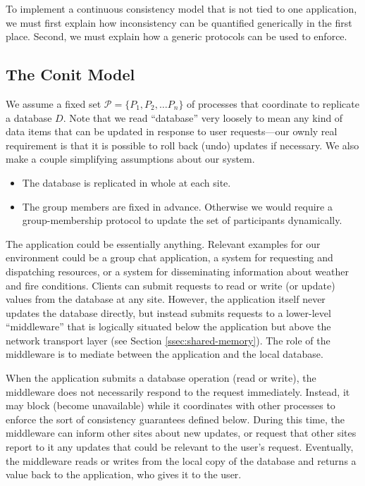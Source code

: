 \documentclass[]             %
{NASA}                       %
\theoremstyle{definition}
\providecommand{\tightlist}{%
  \setlength{\itemsep}{0pt}\setlength{\parskip}{0pt}}
\begin{document}
To implement a continuous consistency model that is not tied to one
application, we must first explain how inconsistency can be quantified
generically in the first place. Second, we must explain how a generic
protocols can be used to enforce.

\subsection{The Conit Model}
\label{ssec:conits}

We assume a fixed set $\mathcal{P} = \{P_1, P_2, \ldots P_n\}$ of
processes that coordinate to replicate a database $D$. Note that we
read ``database'' very loosely to mean any kind of data items that can
be updated in response to user requests---our ownly real requirement
is that it is possible to roll back (undo) updates if necessary. We
also make a couple simplifying assumptions about our system.
\begin{itemize}
  \tightlist
\item The database is replicated in whole at each site.
\item The group members are fixed in advance. Otherwise we would
  require a group-membership protocol to update the set of
  participants dynamically.
\end{itemize}

The application could be essentially anything. Relevant examples for
our environment could be a group chat application, a system for
requesting and dispatching resources, or a system for disseminating
information about weather and fire conditions. Clients can submit
requests to read or write (or update) values from the database at any
site. However, the application itself never updates the database
directly, but instead submits requests to a lower-level ``middleware''
that is logically situated below the application but above the network
transport layer (see Section \ref{ssec:shared-memory}). The role of
the middleware is to mediate between the application and the local
database.

When the application submits a database operation (read or write), the
middleware does not necessarily respond to the request
immediately. Instead, it may block (become unavailable) while it
coordinates with other processes to enforce the sort of consistency
guarantees defined below. During this time, the middleware can inform
other sites about new updates, or request that other sites report to
it any updates that could be relevant to the user's
request. Eventually, the middleware reads or writes from the local
copy of the database and returns a value back to the application, who
gives it to the user.
\end{document}
